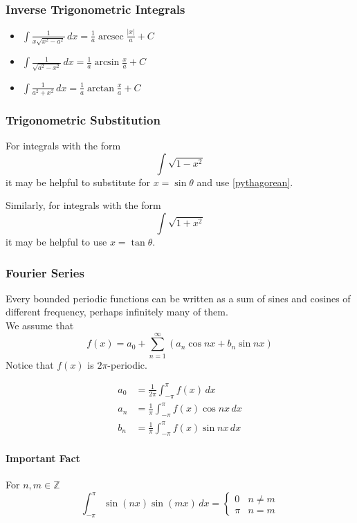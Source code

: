 \documentclass{article}
\DeclareMathOperator{\arcsec}{arcsec}
\begin{document}
\subsubsection{Inverse Trigonometric Integrals}
\begin{itemize}
    \item $\int\frac{1}{x\sqrt{x^2-a^2}}\,dx=\frac{1}{a}\arcsec{\frac{|x|}{a}}+C$
    \item $\int\frac{1}{\sqrt{a^2-x^2}}\,dx=\frac{1}{a}\arcsin{\frac{x}{a}}+C$
    \item $\int\frac{1}{a^2+x^2}\,dx=\frac{1}{a}\arctan{\frac{x}{a}}+C$
\end{itemize}

\subsubsection{Trigonometric Substitution} \label{trig-sub}
For integrals with the form $$\int \sqrt{1-x^2}$$ it may be helpful to substitute for $x=\sin{\theta}$ and use \ref{pythagorean}.

Similarly, for integrals with the form $$\int \sqrt{1+x^2}$$ it may be helpful to use $x=\tan{\theta}$.
\subsubsection{Fourier Series}
Every bounded periodic functions can be written as a sum of sines and cosines of different frequency, perhaps infinitely many of them.\\
We assume that $$f(x)=a_0+\sum_{n=1}^{\infty}\left(a_n\cos{nx}+b_n\sin{nx}\right)$$
Notice that $f(x)$ is $2\pi$-periodic.

\begin{align*}
    a_0&=\frac{1}{2\pi}\int_{-\pi}^\pi f(x)\,dx\\
    a_n&=\frac{1}{\pi}\int_{-\pi}^\pi f(x)\cos{nx}\,dx\\
    b_n&=\frac{1}{\pi}\int_{-\pi}^\pi f(x)\sin{nx}\,dx
\end{align*}


\paragraph{Important Fact}
For $n,m\in\mathbb{Z}$
$$\int_{-\pi}^\pi \sin{\left(nx\right)}\sin{\left(mx\right)}\,dx=\begin{cases}
    0&n\ne m\\
    \pi&n=m
\end{cases}$$
\end{document}
